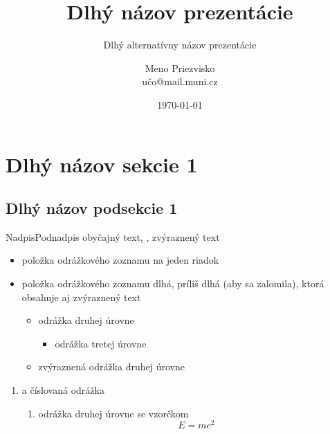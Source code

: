 \documentclass[
]{beamer}
\begin{document}
\title[Názov prezentácie]{Dlhý názov prezentácie}
\subtitle[Alternatívny názov prezentácie]{Dlhý alternatívny názov prezentácie}
\author[M.\,Priezvisko]{Meno Priezvisko \\ učo@mail.muni.cz}
\date{\today}
\subject{Predmet prezentace}

\begin{frame}[plain]
\maketitle
\end{frame}

\section[Názov sekcie 1]{Dlhý názov sekcie 1}
\subsection[Názov podsekcie 1]{Dlhý názov podsekcie 1}

\begin{frame}{Nadpis}{Podnadpis}
obyčajný text, , \alert{zvýraznený text}
\begin{itemize}
  \item položka odrážkového zoznamu na jeden riadok
  \item položka odrážkového zoznamu dlhá, príliš dlhá (aby sa zalomila), ktorá
    obsahuje aj \alert{zvýraznený text}
  \begin{itemize}
    \item odrážka druhej úrovne
    \begin{itemize}
      \item odrážka tretej úrovne
    \end{itemize}
    \item \alert{zvýraznená odrážka druhej úrovne}
  \end{itemize}
\end{itemize}
\begin{enumerate}
  \item a číslovaná odrážka
  \begin{enumerate}
    \item odrážka druhej úrovne se vzorčkom
      \[ E = mc^2 \]
  \end{enumerate}
\end{enumerate}
\end{frame}
\end{document}
